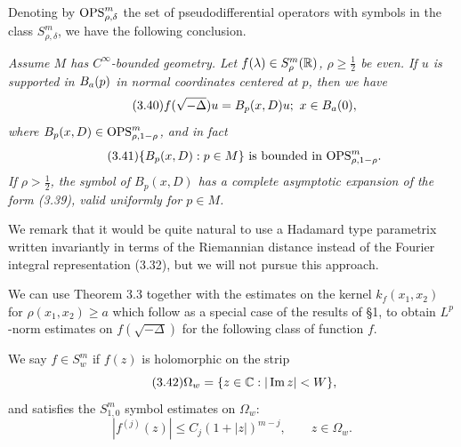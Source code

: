 Denoting by $\mathrm{OPS}^m_{\rho,\delta}$ the set of pseudodifferential operators with symbols in the class $S^m_{\rho,\delta}$, we have the following conclusion.

\begin{theorem}
\label{thm:pdo-representation-of-functional-calculus}
\textit{Assume $M$ has $C^\infty$-bounded geometry. Let $f(\lambda)\in S^m_\rho(\mathbb{R})$, $\rho \ge \frac12$ be even. If $u$ is supported in $B_a(p)$ in normal coordinates centered at $p$, then we have}
\begin{equation}\tag{3.40}
f(\sqrt{-\Delta})u=B_p(x,D)u;\ x\in B_a(0),
\end{equation}
\textit{where $B_p(x,D)\in \mathrm{OPS}^m_{\rho,1-\rho}$, and in fact}
\begin{equation}\tag{3.41}
\{B_p(x,D): p\in M\}\text{ is bounded in }\mathrm{OPS}^m_{\rho,1-\rho}.
\end{equation}
\textit{If $\rho>\frac12$, the symbol of $B_p(x,D)$ has a complete asymptotic expansion of the form (3.39), valid uniformly for $p\in M$.}
\end{theorem}

We remark that it would be quite natural to use a Hadamard type parametrix written invariantly in terms of the Riemannian distance instead of the Fourier integral representation (3.32), but we will not pursue this approach.

We can use Theorem 3.3 together with the estimates on the kernel $k_f(x_1,x_2)$ for $\rho(x_1,x_2)\ge a$ which follow as a special case of the results of \S1, to obtain $L^p$-norm estimates on $f(\sqrt{-\Delta})$ for the following class of function $f$.

\begin{definition}
\label{def:holomorphic-strip-symbol-class}
We say $f\in S_w^m$ if $f(z)$ is holomorphic on the strip
\begin{equation}\tag{3.42}
\Omega_w=\{z\in \mathbb{C} : |\operatorname{Im} z|<W\},
\end{equation}
and satisfies the $S^m_{1,0}$ symbol estimates on $\Omega_w$:
\begin{equation}\tag{3.43}
|f^{(j)}(z)|\le C_j(1+|z|)^{m-j},\qquad z\in \Omega_w.
\end{equation}
\end{definition}

